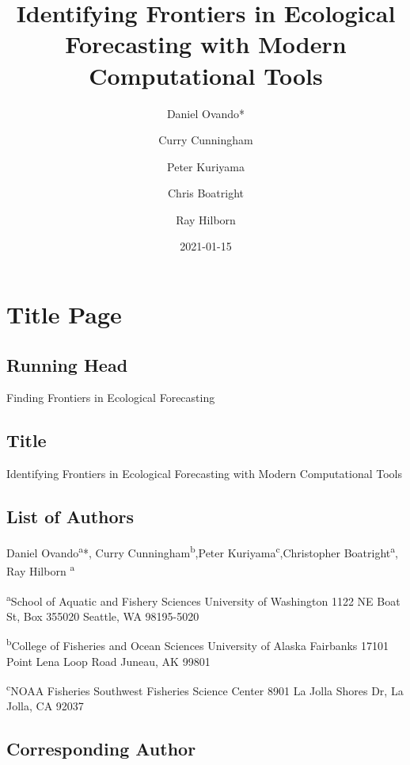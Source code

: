 \documentclass[
]{article}
\title{Identifying Frontiers in Ecological Forecasting with Modern Computational Tools}
\author{Daniel Ovando* \and Curry Cunningham \and Peter Kuriyama \and Chris Boatright \and Ray Hilborn}
\date{2021-01-15}
\begin{document}
\maketitle

\newpage

\hypertarget{title-page}{%
\section*{Title Page}\label{title-page}}

\hypertarget{running-head}{%
\subsection*{Running Head}\label{running-head}}

Finding Frontiers in Ecological Forecasting

\hypertarget{title}{%
\subsection*{Title}\label{title}}

Identifying Frontiers in Ecological Forecasting with Modern Computational Tools

\hypertarget{list-of-authors}{%
\subsection*{List of Authors}\label{list-of-authors}}

Daniel Ovando\textsuperscript{a}*, Curry Cunningham\textsuperscript{b},Peter Kuriyama\textsuperscript{c},Christopher Boatright\textsuperscript{a}, Ray Hilborn \textsuperscript{a}

\textsuperscript{a}School of Aquatic and Fishery Sciences University of Washington 1122 NE Boat St, Box 355020 Seattle, WA 98195-5020

\textsuperscript{b}College of Fisheries and Ocean Sciences University of Alaska Fairbanks 17101 Point Lena Loop Road Juneau, AK 99801

\textsuperscript{c}NOAA Fisheries Southwest Fisheries Science Center 8901 La Jolla Shores Dr, La Jolla, CA 92037

\hypertarget{corresponding-author}{%
\subsection*{Corresponding Author}\label{corresponding-author}}
\end{document}
